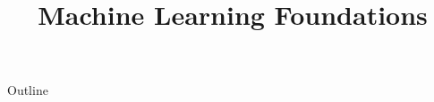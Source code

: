 \documentclass[xcolor=dvipsnames,compress,t,pdf,9pt]{beamer}
\title[\insertframenumber /\inserttotalframenumber]{Machine Learning Foundations}
\begin{document}
	\begin{frame}
	\titlepage
	\end{frame}

	\begin{frame}{Outline}
	    \tableofcontents
	\end{frame}

	
	
	
\end{document}
